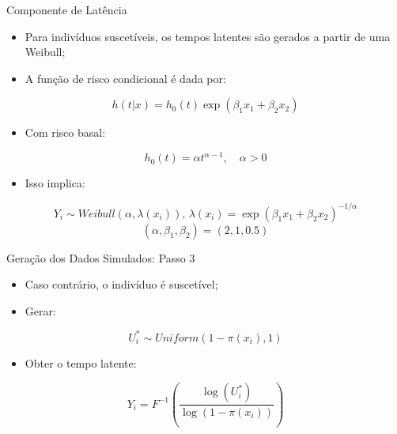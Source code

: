 \documentclass[aspectratio=169,t,xcolor=table]{beamer}
\begin{document}
\begin{frame}{Componente de Latência}

\begin{itemize}
\item Para indivíduos suscetíveis, os tempos latentes são gerados a partir de uma Weibull;

\vspace{0.3cm}

\item A função de risco condicional é dada por:

\end{itemize}
\[
h(t|x)=h_0(t)\exp(\beta_1x_1+\beta_2x_2)
\]

\vspace{0.4cm}

\begin{itemize}
\item Com risco basal:
\end{itemize}
\[
h_0(t)=\alpha t^{\alpha-1}, \quad \alpha>0
\]

\vspace{0.4cm}
\begin{itemize}
\item Isso implica:
\end{itemize}
\[
Y_i \sim Weibull(\alpha,\lambda(x_i))\text{, } \lambda(x_i) = \exp(\beta_1x_1+\beta_2x_2)^{-1/\alpha}
\]
\[
\left(\alpha, \beta_{1}, \beta_{2}\right) = \left(2, 1, 0.5\right)
\]


\end{frame}


\begin{frame}{Geração dos Dados Simulados: Passo 3}

\begin{itemize}
\item Caso contrário, o indivíduo é suscetível;

\vspace{0.3cm}

\item Gerar:

\end{itemize}

\[
U_i^* \sim Uniform(1-\pi(x_i),1)
\]

\vspace{0.4cm}

\begin{itemize}
\item Obter o tempo latente:
\end{itemize}

\[
Y_i=
F^{-1}
\left(
\frac{\log(U_i^*)}
{\log(1-\pi(x_i))}
\right)
\]

\end{frame}
\end{document}
